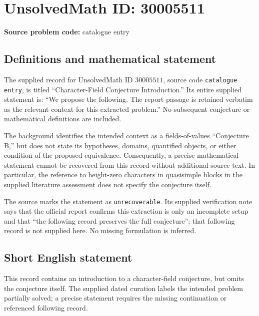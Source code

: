 \documentclass[11pt]{article}
\begin{document}
\section*{UnsolvedMath ID: 30005511}
\textbf{Source problem code:} catalogue entry
\subsection{Definitions and mathematical statement}
The supplied record for UnsolvedMath ID \(30005511\), source code \texttt{catalogue entry}, is titled ``Character-Field Conjecture Introduction.'' Its entire supplied statement is: ``We propose the following. The report passage is retained verbatim as the relevant context for this extracted problem.'' No subsequent conjecture or mathematical definitions are included.

The background identifies the intended context as a fields-of-values ``Conjecture B,'' but does not state its hypotheses, domains, quantified objects, or either condition of the proposed equivalence. Consequently, a precise mathematical statement cannot be recovered from this record without additional source text. In particular, the reference to height-zero characters in quasisimple blocks in the supplied literature assessment does not specify the conjecture itself.

The source marks the statement as \texttt{unrecoverable}. Its supplied verification note says that the official report confirms this extraction is only an incomplete setup and that ``the following record preserves the full conjecture''; that following record is not supplied here. No missing formulation is inferred.
\subsection{Short English statement}
This record contains an introduction to a character-field conjecture, but omits the conjecture itself. The supplied dated curation labels the intended problem partially solved; a precise statement requires the missing continuation or referenced following record.
\end{document}
